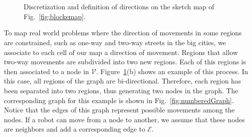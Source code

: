 \documentclass[smallcondensed]{svjour3}
\begin{document}
\begin{figure}[h]
\centering
    \\
\\   
    \caption{Discretization and definition of directions on the sketch map of Fig.~\ref{fig:blockemap}.}
    \label{fig:samplemap}
\end{figure}
 
To map real world problems where the direction of movements in some regions are constrained, such as one-way and two-way streets in the big cities, we associate to each cell of our map a direction of movement. Regions that allow two-way movements are subdivided into two new regions. Each of this regions is then associated to a node in $\mathcal{V}$. Figure~\ref{fig:samplemap}(b) shows an example of this process. In this case, all regions of the graph are bi-directional. Therefore, each region has been separated into two regions, thus generating two nodes in the graph. The corresponding graph for this example is shown in Fig.~\ref{fig:numberedGraph}. Notice that the edges of this graph represent possible movements among the nodes. If a robot can move from a node to another, we assume that these nodes are neighbors and add a corresponding edge to $\mathcal{E}$.
\end{document}
